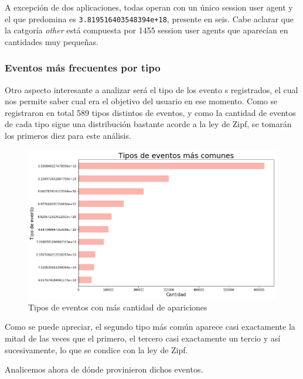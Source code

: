 \documentclass[a4paper, 12pt]{article}
\begin{document}
		A excepción de dos aplicaciones, todas operan con un único session user agent y el que predomina es \texttt{3.819516403548394e+18}, presente en seis. Cabe aclarar que la catgoría \textit{other} está compuesta por 1455 session user agents que aparecían en cantidades muy pequeñas.
		
	\subsubsection{Eventos más frecuentes por tipo}
	
		Otro aspecto interesante a analizar será el tipo de los evento s registrados, el cual nos permite saber cual era el objetivo del usuario en ese momento. Como se registraron en total 589 tipos distintos de eventos, y como la cantidad de eventos de cada tipo sigue una distribución bastante acorde a la ley de Zipf, se tomarán los primeros diez para este análisis.
		
		\FloatBarrier
		\begin{figure}[h]
			\centering
			\includegraphics[width=\textwidth]{images/events/top10events.png}
			\caption{Tipos de eventos con más cantidad de apariciones}
		\end{figure}
		\FloatBarrier
		
		Como se puede apreciar, el segundo tipo más común aparece casi exactamente la mitad de las veces que el primero, el tercero casi exactamente un tercio y así sucesivamente, lo que se condice con la ley de Zipf.
		
		Analicemos ahora de dónde provinieron dichos eventos.
		
\end{document}
